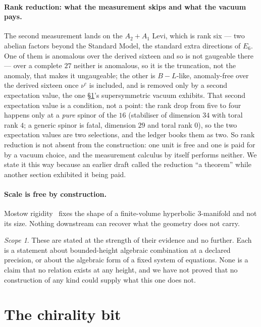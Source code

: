 \documentclass[11pt,a4paper]{article}
\theoremstyle{definition}
\theoremstyle{remark}
\newtheorem{scopenote}{Scope}
\begin{document}
\paragraph{Rank reduction: what the measurement skips and what the vacuum pays.} The second measurement lands on the
$A_2{+}A_1$ Levi, which is rank six --- two abelian factors beyond the Standard Model, the standard extra directions of $E_6$.
One of them is anomalous over the derived sixteen and so is not gaugeable there --- over a complete $27$ neither is anomalous,
so it is the truncation, not the anomaly, that makes it ungaugeable; the other is $B\!-\!L$-like, anomaly-free over
the derived sixteen once $\nu^c$ is included, and is removed only by a second expectation value, the one \S\ref{sec:chirality}'s supersymmetric vacuum exhibits. That second expectation value is a condition, not a point: the rank drop from five to four happens only at a \emph{pure} spinor of the $16$ (stabiliser of dimension $34$ with toral rank $4$; a generic spinor is fatal, dimension $29$ and toral rank $0$), so the two expectation values are two selections, and the ledger books them as two. So rank reduction is not absent from the construction: one unit is free and one is paid for by a vacuum
choice, and the measurement calculus by itself performs neither. We state it this way because an earlier draft called the
reduction ``a theorem'' while another section exhibited it being paid.

\paragraph{Scale is free by construction.} Mostow rigidity~\cite{mostow} fixes the shape of a finite-volume hyperbolic
$3$-manifold and not its size. Nothing downstream can recover what the geometry does not
carry.

\begin{scopenote}
These are stated at the strength of their evidence and no further. Each is a statement about
bounded-height algebraic combination at a declared precision, or about the algebraic form of a fixed
system of equations. None is a claim that no relation exists at any height, and we have not proved
that no construction of any kind could supply what this one does not.
\end{scopenote}

\section{The chirality bit}\label{sec:chirality}
\end{document}
